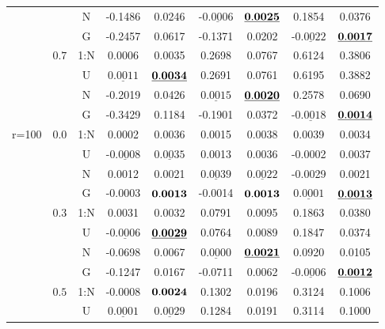 \documentclass[12pt]{article}
\newcommand{\ul}{\underline}
\begin{document}
\begin{table}[htp!]
\begin{center}
{\begin{tabular}{|c|c|c|c|c|c|c|c|c| }
&		   &N&    -0.1486  & 0.0246    &-$\ul{0.0006}$  &${\bf\ul{ 0.0025}}$ & 0.1854  & 0.0376    \\
&		   &G&    -0.2457  & 0.0617    & -0.1371  & 0.0202 &-$\ul{0.0022}$  &${\bf\ul{ 0.0017}}$  \\
		\cline{2-9}	
&		 $0.7$&1:N&    0.0006  & 0.0035    & 0.2698  & 0.0767 & 0.6124  & 0.3806    \\
&		   &U&$\ul{    0.0011}$  &${\bf\ul{ 0.0034}}$  & 0.2691  & 0.0761 & 0.6195  & 0.3882    \\
&		   &N&    -0.2019  & 0.0426    &$\ul{ 0.0015}$  &${\bf\ul{ 0.0020}}$ & 0.2578  & 0.0690    \\
&		   &G&    -0.3429  & 0.1184    & -0.1901  & 0.0372 &-$\ul{0.0018}$  &${\bf\ul{ 0.0014}}$  \\ \hline
\multirow{15}{1cm}{r=100}&  $0.0$&1:N&    0.0002  & 0.0036  & 0.0015  & 0.0038 & 0.0039  & 0.0034  \\
		  & &U&-$\ul{0.0008}$  &$\ul{ 0.0035}$  & 0.0013  & 0.0036 & -0.0002  & 0.0037  \\
		  & &N&    0.0012  & 0.0021  &$\ul{ 0.0039}$  &$\ul{ 0.0022}$ & -0.0029  & 0.0021  \\
		  & &G&    -0.0003  &${\bf 0.0013}$  & -0.0014  &${\bf 0.0013}$ &$\ul{ 0.0001}$  &${\bf\ul{ 0.0013}}$  \\
        \cline{2-9}
        & $0.3$&1:N&    0.0031  & 0.0032    & 0.0791  & 0.0095 & 0.1863  & 0.0380    \\
	&	   &U&-$\ul{0.0006}$  &${\bf\ul{ 0.0029}}$  & 0.0764  & 0.0089 & 0.1847  & 0.0374    \\
	&	   &N&    -0.0698  & 0.0067    &$\ul{ 0.0000}$  &${\bf\ul{ 0.0021}}$ & 0.0920  & 0.0105    \\
	&	   &G&    -0.1247  & 0.0167    & -0.0711  & 0.0062 &-$\ul{0.0006}$  &${\bf\ul{ 0.0012}}$  \\
	\cline{2-9}
	&	 $0.5$&1:N&    -0.0008  & ${\bf 0.0024}$    & 0.1302  & 0.0196 & 0.3124  & 0.1006    \\
	&	   &U&$\ul{    0.0001}$  &$\ul{ 0.0029}$  & 0.1284  & 0.0191 & 0.3114  & 0.1000    \\

\end{tabular}}
\end{center}
\end{table}
\end{document}

